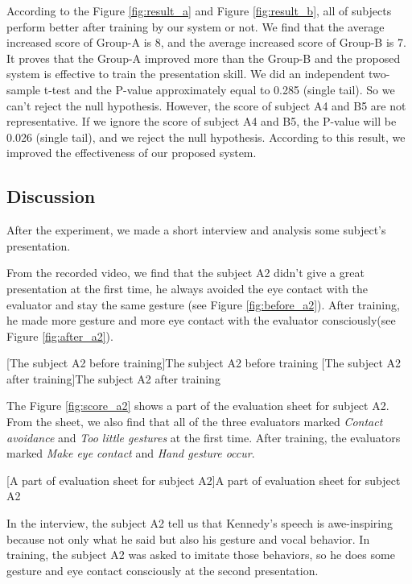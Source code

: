 \par According to the Figure \ref{fig:result_a} and Figure \ref{fig:result_b}, all of subjects perform better after training by our system or not. We find that the average increased score of Group-A is 8, and the average increased score of Group-B is 7. It proves that the Group-A improved more than the Group-B and the proposed system is effective to train the presentation skill. We did an independent two-sample t-test and the P-value approximately equal to 0.285 (single tail). So we can't reject the null hypothesis. However, the score of subject A4 and B5 are not representative. If we ignore the score of subject A4 and B5, the P-value will be 0.026 (single tail), and we reject the null hypothesis. According to this result, we improved the effectiveness of our proposed system.


\subsection*{Discussion}
\label{sub:dis}

\par After the experiment, we made a short interview and analysis some subject's presentation.

\par From the recorded video, we find that the subject A2 didn't give a great presentation at the first time, he always avoided the eye contact with the evaluator and stay the same gesture (see Figure \ref{fig:before_a2}). After training, he made more gesture and more eye contact with the evaluator consciously(see Figure \ref{fig:after_a2}).

[The subject A2 before training]{The subject A2 before training}
[The subject A2 after training]{The subject A2 after training}

\par The Figure \ref{fig:score_a2} shows a part of the evaluation sheet for subject A2. From the sheet, we also find that all of the three evaluators marked \emph{Contact avoidance} and \emph{Too little gestures} at the first time. After training, the evaluators marked \emph{Make eye contact} and \emph{Hand gesture occur}.

[A part of evaluation sheet for subject A2]{A part of evaluation sheet for subject A2}

\par In the interview, the subject A2 tell us that Kennedy's speech is awe-inspiring because not only what he said but also his gesture and vocal behavior. In training, the subject A2 was asked to imitate those behaviors, so he does some gesture and eye contact consciously at the second presentation. 

